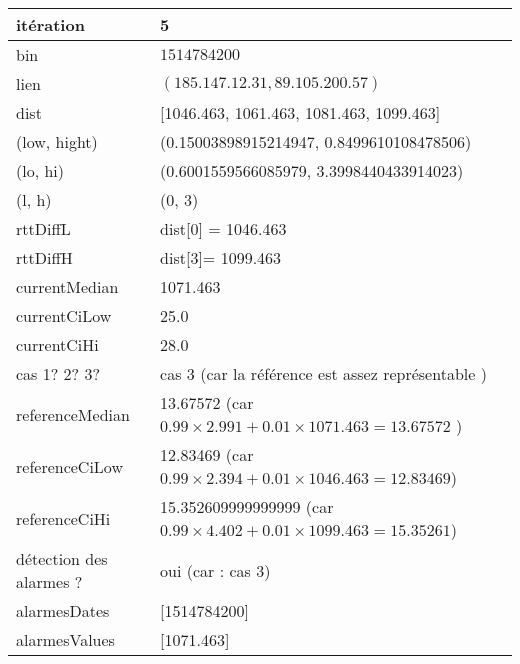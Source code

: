 	\begin{table}[H]
	\centering
	
	\begin{tabularx}{\linewidth}{|l|X| }
		\hline
		itération & 5	\\ \hline
		bin & $1514784200$ \\ \hline
		lien & $(185.147.12.31, 89.105.200.57)$  \\ \hline
		dist& [1046.463, 1061.463, 1081.463, 1099.463]	\\ \hline
		(low, hight)& (0.15003898915214947, 0.8499610108478506) 	\\ \hline
		(lo, hi)&(0.6001559566085979, 3.3998440433914023)  \\ \hline
		(l, h) & (0, 3) 	\\ \hline
		rttDiffL& dist[0] = 1046.463	\\ \hline
		rttDiffH& dist[3]= 1099.463	\\ \hline
		currentMedian& 1071.463	\\ \hline
		currentCiLow& 25.0 	\\ \hline
		currentCiHi& 28.0	\\ \hline
		cas 1? 2? 3?& cas 3 (car la référence est assez représentable )  \\ \hline
		referenceMedian& 13.67572 (car $ 0.99×2.991 + 0.01×1071.463 = 13.67572 $ ) 	\\ \hline
		referenceCiLow& 12.83469  (car $ 0.99×2.394+ 0.01×1046.463 = 12.83469  $)	\\ \hline
		referenceCiHi& 15.352609999999999 (car $ 0.99×4.402 + 0.01×1099.463 = 15.35261 $)	\\ \hline
		détection des alarmes ?& oui (car : cas 3)	\\ \hline
		alarmesDates& [1514784200]	\\ \hline
		alarmesValues& [1071.463]	\\ \hline
		
	\end{tabularx}
\end{table}



